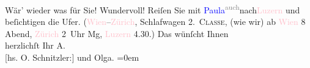            \pstart
           {\pb}Wär’ wieder was für Sie! Wundervoll! Reiſen Sie mit
                  \textcolor{blue}{Paula}{}\ledrightnote{\textcolor{blue}{Paula Beer-Hofmann}}{ }\substVorne{}\textsuperscript{\textcolor{gray}{auch}}\substDazwischen{}nach\substHinten{}{ }\textcolor{pink}{Luzern}{}\ledrightnote{\textcolor{pink}{Luzern}} und beſichtigen die Ufer. (\textcolor{pink}{Wien}{}\ledrightnote{\textcolor{pink}{Wien}}–\textcolor{pink}{Zürich}{}\ledrightnote{\textcolor{pink}{Zürich}}, Schlafwagen 2. \textsc{Classe}, (wie wir) ab \textcolor{pink}{Wien}{}\ledrightnote{\textcolor{pink}{Wien}} 8
               Abend, \textcolor{pink}{Zürich}{}\ledrightnote{\textcolor{pink}{Zürich}} 2 Uhr \introOben{}Mg\introOben{}, \textcolor{pink}{Luzern}{}\ledrightnote{\textcolor{pink}{Luzern}} 4.30.)\pend
           \pstart
           Das wünſcht Ihnen{\\[\baselineskip]}herzlichſt Ihr \spacefill\mbox{A.}{\\[\baselineskip]}{[}hs. O. Schnitzler:{]} und \spacefill\mbox{Olga.}\pend
           \leftskip=0em{}\endnumbering{}  
      